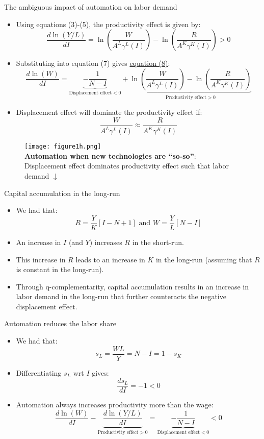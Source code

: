 \documentclass[notes=show]{beamer}
\begin{document}
\begin{frame}{The ambiguous impact of automation on labor demand}
\begin{itemize}
\item Using equations (3)-(5), the productivity effect is given by:
\[
\frac{d\ln(Y/L)}{dI} = \ln \left( \frac{W}{A^{L}\gamma^{L}(I)} \right) - \ln \left( \frac{R}{A^{K}\gamma^{K}(I)} \right) > 0
\]
\item Substituting into equation (7) gives \underline{equation (8)}:
\[
\frac{d\ln(W)}{dI}=\underbrace{-\frac{1}{N-I}}_{\text{Displacement effect}<0} + \underbrace{\ln \left(\frac{W}{A^{L}\gamma^{L}(I)} \right) - \ln \left(\frac{R}{A^{K}\gamma^{K}(I)} \right)}_{\text{Productivity effect}>0} \label{eq8}
\]
\item Displacement effect will dominate the productivity effect if:
\[
\frac{W}{A^{L}\gamma^{L}(I)} \approx \frac{R}{A^{K}\gamma^{K}(I)}
\]
\end{itemize}
\end{frame}

\newpage
\begin{center}
\begin{figure}
\texttt{[image: figure1h.png]}
\\ \textbf{Automation when new technologies are ``so-so''}: \\
Displacement effect dominates productivity effect such that labor demand $ \downarrow$
\end{figure} 
\end{center}
\newpage

\begin{frame}{Capital accumulation in the long-run}
\begin{itemize}
\item We had that:
\[
R = \frac{Y}{K}[I-N+1] \text{ and }  W = \frac{Y}{L}[N-I] \tag{5}
\]
\item An increase in $I$ (and $Y$) increases $R$ in the short-run. \medskip
\item This increase in $R$ leads to an increase in $K$ in the long-run (assuming that $R$ is constant in the long-run). \medskip
\item Through q-complementarity, capital accumulation results in an increase in labor demand in the long-run that further counteracts the negative displacement effect.
\end{itemize}
\end{frame}

\begin{frame}{Automation reduces the labor share}
\begin{itemize}
\item We had that:
\[
s_{L} = \frac{WL}{Y} = N-I  = 1 - s_{K} \tag{6}
\]
\item Differentiating $s_{L}$ wrt $I$ gives:
\[
\frac{ds_{L}}{dI} = -1 < 0 \tag{9} \label{eq9}
\]
\item Automation always increases productivity more than the wage:
\[
\frac{d\ln(W)}{dI} - \underbrace{\frac{d\ln(Y/L)}{dI}}_{\text{Productivity effect}>0} =\underbrace{-\frac{1}{N-I}}_{\text{Displacement effect}<0} <0 \tag{7}
\]
\end{itemize}
\end{frame}
\end{document}
